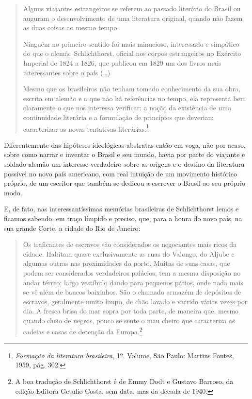 \begin{quote}
Alguns viajantes estrangeiros se
referem ao passado literário do Brasil ou auguram o desenvolvimento de
uma literatura original, quando não fazem as duas coisas ao mesmo
tempo.

Ninguém no primeiro sentido foi mais minucioso, interessado e
simpático do que o alemão Schlichthorst, oficial nos corpos estrangeiros
no Exército Imperial de 1824 a 1826, que publicou em 1829 um dos livros
mais interessantes sobre o país (\ldots{})

Mesmo que os brasileiros não tenham tomado conhecimento da sua obra, escrita em alemão e a que não há referências no tempo, ela representa bem claramente o que nos
interessa verificar: a noção da existência de uma continuidade literária
e a formulação de princípios que deveriam caracterizar as novas
tentativas literárias.\footnote{\emph{Formação da literatura
  brasileira}, 1º. Volume, São Paulo: Martins Fontes, 1959, pág. 302.}
\end{quote}

Diferentemente das hipóteses ideológicas abstratas então em voga, não
por acaso, sobre como narrar e inventar o Brasil e seu mundo, havia por
parte do viajante e soldado alemão um interesse verdadeiro sobre as
origens e o destino da literatura possível no novo país americano, com
real intuição de um movimento histórico próprio, de um escritor que
também se dedicou a escrever o Brasil ao seu próprio modo.

E, de fato, nas interessantíssimas memórias brasileiras de Schlichthorst
lemos e ficamos sabendo, em traço límpido e preciso, que, para a honra
do novo país, na sua grande Corte, a cidade do Rio de Janeiro:

\begin{quote}
Os traficantes de escravos são considerados os negociantes mais ricos
da cidade. Habitam quase exclusivamente as ruas do Valongo, do Aljube e
algumas outras nas proximidades do porto. Muitas de suas casas, que
podem ser considerados verdadeiros palácios, tem a mesma disposição no
andar térreo: largo vestíbulo dando para pequenos pátios, onde nada mais
se vê além de bancos baixinhos. São o chamado armazém de depósitos de
escravos, geralmente muito limpo, de chão lavado e varrido várias vezes
por dia. A fresca brisa do mar sopra por toda parte, de maneira que,
mesmo quando cheio de negros, pouco se sente o mau cheiro que
caracteriza as cadeias e casas de detenção da Europa.\footnote{A boa
  tradução de Schlichthorst é de Emmy Dodt e Gustavo Barroso, da edição
  Editora Getulio Costa, sem data, mas da década de 1940.}
\end{quote}

